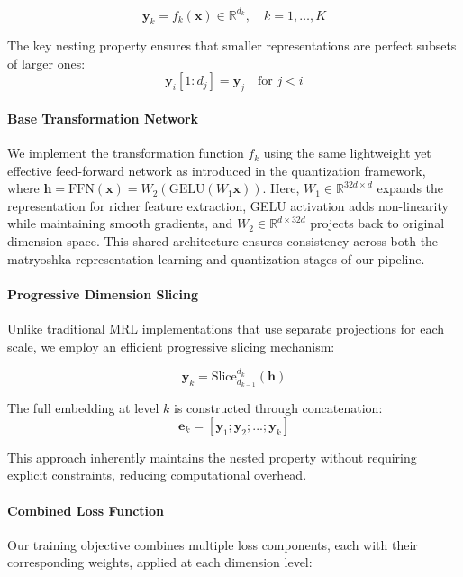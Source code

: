 \begin{equation}
    \mathbf{y}_k = f_k(\mathbf{x}) \in \mathbb{R}^{d_k}, \quad k = 1,\ldots,K
\end{equation}

The key nesting property ensures that smaller representations are perfect subsets of larger ones:
\begin{equation}
    \mathbf{y}_i[1:d_j] = \mathbf{y}_j \quad \text{for } j < i
\end{equation}

\paragraph{Base Transformation Network}
We implement the transformation function $f_k$ using the same lightweight yet effective feed-forward network as introduced in the quantization framework, where $\mathbf{h} = \text{FFN}(\mathbf{x}) = W_2(\text{GELU}(W_1\mathbf{x}))$. Here, $W_1 \in \mathbb{R}^{32d \times d}$ expands the representation for richer feature extraction, GELU activation adds non-linearity while maintaining smooth gradients, and $W_2 \in \mathbb{R}^{d \times 32d}$ projects back to original dimension space. This shared architecture ensures consistency across both the matryoshka representation learning and quantization stages of our pipeline.

\paragraph{Progressive Dimension Slicing}
Unlike traditional MRL implementations that use separate projections for each scale, we employ an efficient progressive slicing mechanism:

\begin{equation}
    \mathbf{y}_k = \text{Slice}_{d_{k-1}}^{d_k}(\mathbf{h})
\end{equation}

The full embedding at level $k$ is constructed through concatenation:
\begin{equation}
    \mathbf{e}_k = [\mathbf{y}_1; \mathbf{y}_2; ...; \mathbf{y}_k]
\end{equation}

This approach inherently maintains the nested property without requiring explicit constraints, reducing computational overhead.

\paragraph{Combined Loss Function}
Our training objective combines multiple loss components, each with their corresponding weights, applied at each dimension level:

